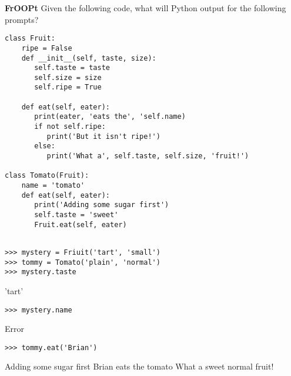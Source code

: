 \begin{blocksection}
\question \textbf{FrOOPt} \newline
Given the following code, what will Python output for the following prompts? 

\begin{lstlisting}
class Fruit:
    ripe = False
    def __init__(self, taste, size):
       self.taste = taste
       self.size = size
       self.ripe = True
    
    def eat(self, eater):
       print(eater, 'eats the', 'self.name)
       if not self.ripe:
          print('But it isn't ripe!')
       else:
          print('What a', self.taste, self.size, 'fruit!')

class Tomato(Fruit):
    name = 'tomato'
    def eat(self, eater):  
       print('Adding some sugar first')
       self.taste = 'sweet'
       Fruit.eat(self, eater) 
       
\end{lstlisting}
\end{blocksection}
\newline
\newline
\newline
\begin{blocksection}

\begin{lstlisting}
>>> mystery = Friuit('tart', 'small')
>>> tommy = Tomato('plain', 'normal')
>>> mystery.taste
\end{lstlisting}
\begin{solution}[.2in]
'tart'
\end{solution}

\begin{lstlisting}
>>> mystery.name
\end{lstlisting}
\begin{solution}[.2in]
Error
\end{solution}

\begin{lstlisting}
>>> tommy.eat('Brian')
\end{lstlisting}
\begin{solution}[.2in]
Adding some sugar first \newline
Brian eats the tomato \newline
What a sweet normal fruit!
\end{solution}
\end{blocksection}


